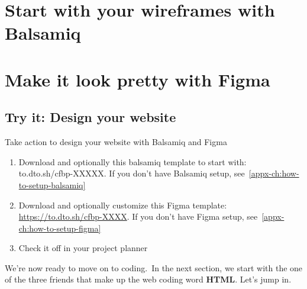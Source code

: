 \section{Start with your wireframes with Balsamiq}\label{sec:start-with-your-wireframes-with-balsamiq}


\section{Make it look pretty with Figma}\label{sec:make-it-look-pretty-with-figma}

\subsection{Try it: Design your website}\label{subsec:design-your-website}
Take action to design your website with Balsamiq and Figma
\begin{enumerate}
    \item Download and optionally this balsamiq template to start with: to.dto.sh/cfbp-XXXXX. If you don't have Balsamiq setup, see~\ref{appx-ch:how-to-setup-balsamiq}
    \item Download and optionally customize this Figma template: \href{https://to.dto.sh/cfbp-XXXX}{https://to.dto.sh/cfbp-XXXX}.
    If you don't have Figma setup, see~\ref{appx-ch:how-to-setup-figma}
    \item Check it off in your project planner
\end{enumerate}

We're now ready to move on to coding.\ In the next section, we start with the one of the three friends that make up the web coding word \textbf{HTML}.
Let's jump in.



